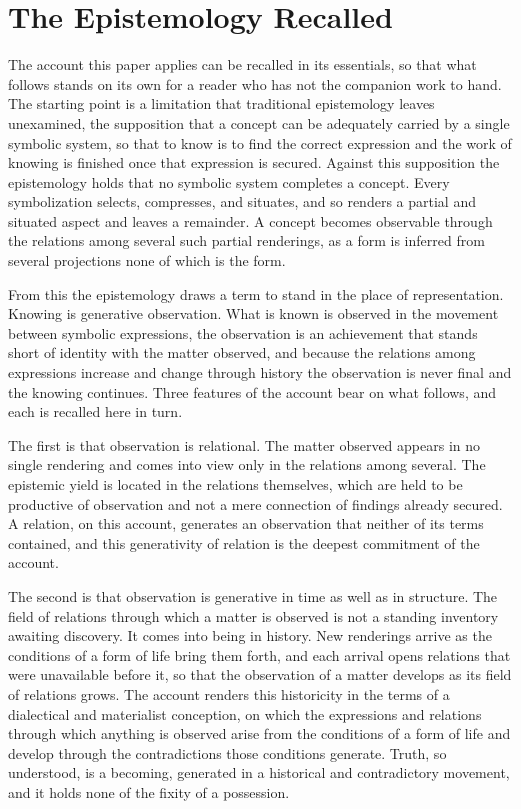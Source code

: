 \section{The Epistemology Recalled}
\label{p27:sec:recap}

\noindent
The account this paper applies can be recalled in its essentials, so that what follows stands on its own for a reader who has not the companion work to hand. The starting point is a limitation that traditional epistemology leaves unexamined, the supposition that a concept can be adequately carried by a single symbolic system, so that to know is to find the correct expression and the work of knowing is finished once that expression is secured. Against this supposition the epistemology holds that no symbolic system completes a concept. Every symbolization selects, compresses, and situates, and so renders a partial and situated aspect and leaves a remainder. A concept becomes observable through the relations among several such partial renderings, as a form is inferred from several projections none of which is the form.

From this the epistemology draws a term to stand in the place of representation. Knowing is generative observation. What is known is observed in the movement between symbolic expressions, the observation is an achievement that stands short of identity with the matter observed, and because the relations among expressions increase and change through history the observation is never final and the knowing continues. Three features of the account bear on what follows, and each is recalled here in turn.

The first is that observation is relational. The matter observed appears in no single rendering and comes into view only in the relations among several. The epistemic yield is located in the relations themselves, which are held to be productive of observation and not a mere connection of findings already secured. A relation, on this account, generates an observation that neither of its terms contained, and this generativity of relation is the deepest commitment of the account.

The second is that observation is generative in time as well as in structure. The field of relations through which a matter is observed is not a standing inventory awaiting discovery. It comes into being in history. New renderings arrive as the conditions of a form of life bring them forth, and each arrival opens relations that were unavailable before it, so that the observation of a matter develops as its field of relations grows. The account renders this historicity in the terms of a dialectical and materialist conception, on which the expressions and relations through which anything is observed arise from the conditions of a form of life and develop through the contradictions those conditions generate. Truth, so understood, is a becoming, generated in a historical and contradictory movement, and it holds none of the fixity of a possession.

